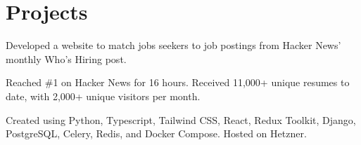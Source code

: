\documentclass[]{deedy-resume-openfont}
\begin{document}
\section{Projects}
\vspace{4pt}
\separator










\hfill{}
\begin{tightemize}
\item Developed a website to match jobs seekers to job postings from Hacker News’ monthly Who’s Hiring post. 
\item Reached \#1 on Hacker News for 16 hours. Received 11,000+ unique resumes to date, with 2,000+ unique visitors per month. 
\item Created using Python, Typescript, Tailwind CSS, React, Redux Toolkit, Django, PostgreSQL, Celery, Redis, and Docker Compose. Hosted on Hetzner.
\end{tightemize}
\sectionsep
\end{document}
